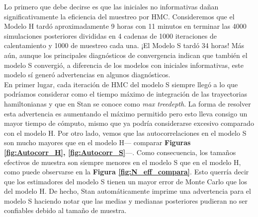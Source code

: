  Lo primero que debe decirse es que las iniciales no informativas dañan significativamente la eficiencia del muestreo por HMC. Consideremos que el Modelo H tardó aproximadamente 9 horas con 11 minutos en terminar las 4000 simulaciones posteriores divididas en 4 cadenas de 1000 iteraciones de calentamiento y 1000 de muestreo cada una. ¡El Modelo S tardó 34 horas! Más aún, aunque los principales diagnósticos de convergencia indican que también el modelo S convergió, a diferencia de los modelos con iniciales informativas, este modelo sí generó advertencias en algunos diagnósticos.\\
 
 En primer lugar, cada iteración de HMC del modelo S siempre llegó a lo que podríamos considerar como el tiempo máximo de integración de las trayectorias hamiltonianas y que en Stan se conoce como \textit{max treedepth}. La forma de resolver esta advertencia es aumentando el máximo permitido pero esto lleva consigo un mayor tiempo de cómputo, mismo que ya podría considerarse excesivo comparado con el modelo H. Por otro lado, vemos que las autocorrelaciones en el modelo S son mucho mayores que en el modelo H--- comparar \textbf{Figuras  \ref{fig:Autocorr_H}, \ref{fig:Autocorr_S}}---. Como consecuencia, los tamaños efectivos de muestra son siempre menores en el modelo S que en el modelo H, como puede observarse en la \textbf{Figura \ref{fig:N_eff_compara}}. Esto querría decir que los estimadores del modelo S tienen un mayor error de Monte Carlo que los del modelo H. De hecho, Stan automáticamente imprime una advertencia para el modelo S haciendo notar que las medias y medianas posteriores pudieran no ser confiables debido al tamaño de muestra.\\
 

